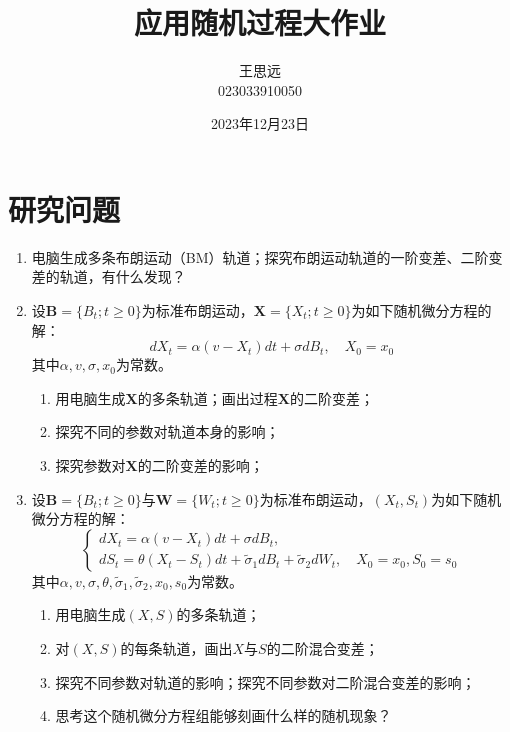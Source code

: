 \documentclass[12pt,a4paper]{article}
\title{应用随机过程大作业}
\author{王思远 \\ {023033910050} }
\date{2023年12月23日}
\begin{document}
\maketitle

\section{研究问题}

\begin{enumerate}
    \item 电脑生成多条布朗运动（BM）轨道；探究布朗运动轨道的一阶变差、二阶变差的轨道，有什么发现？
    
    \item 设\( \mathbf{B} = \{B_t; t \geq 0\} \)为标准布朗运动，\( \mathbf{X} = \{X_t; t \geq 0\} \)为如下随机微分方程的解：
    \[
    dX_t = \alpha(v - X_t)dt + \sigma dB_t, \quad X_0 = x_0
    \]
    其中\( \alpha, v, \sigma, x_0 \)为常数。
    \begin{enumerate}
        \item 用电脑生成\( \mathbf{X} \)的多条轨道；画出过程\( \mathbf{X} \)的二阶变差；
        \item 探究不同的参数对轨道本身的影响；
        \item 探究参数对\( \mathbf{X} \)的二阶变差的影响；
    \end{enumerate}

    \item 设\( \mathbf{B} = \{B_t; t \geq 0\} \)与\( \mathbf{W} = \{W_t; t \geq 0\} \)为标准布朗运动，\( (X_t, S_t) \)为如下随机微分方程的解：
    \[
    \begin{cases}
    dX_t = \alpha(v - X_t)dt + \sigma dB_t,\\
    dS_t = \theta(X_t - S_t)dt + \tilde{\sigma}_1 dB_t + \tilde{\sigma}_2 dW_t, \quad X_0 = x_0, S_0 = s_0
    \end{cases}
    \]
    其中\( \alpha, v, \sigma, \theta, \tilde{\sigma}_1, \tilde{\sigma}_2, x_0, s_0 \)为常数。
    \begin{enumerate}
        \item 用电脑生成\( (X, S) \)的多条轨道；
        \item 对\( (X, S) \)的每条轨道，画出\( X \)与\( S \)的二阶混合变差；
        \item 探究不同参数对轨道的影响；探究不同参数对二阶混合变差的影响；
        \item 思考这个随机微分方程组能够刻画什么样的随机现象？
    \end{enumerate}
\end{enumerate}
\end{document}

